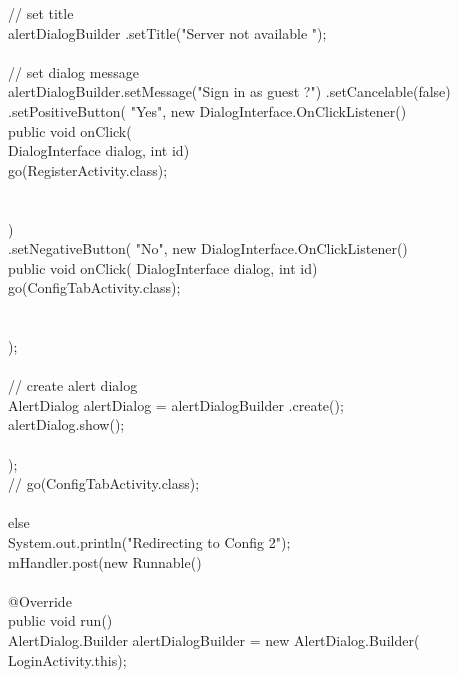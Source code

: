 \documentclass[12pt,a4paper]{article}
\begin{document}
{{{{{{{{									// set title\\
									alertDialogBuilder
											.setTitle("Server not available ");\\
\\
									// set dialog message\\
									alertDialogBuilder.setMessage("Sign in as guest ?")
											.setCancelable(false)
											.setPositiveButton(
													"Yes",
													new DialogInterface.OnClickListener() {\\
														public void onClick(\\
																DialogInterface dialog,
																int id) {\\
															go(RegisterActivity.class);\\
\\
														}\\
													})\\
											.setNegativeButton(
													"No",
													new DialogInterface.OnClickListener() {\\
														public void onClick(
																DialogInterface dialog,
																int id) {\\
															go(ConfigTabActivity.class);\\
\\
														}\\
													});\\
\\
									// create alert dialog\\
									AlertDialog alertDialog = alertDialogBuilder
											.create();\\

									alertDialog.show();\\
								}\\

							});\\
							// go(ConfigTabActivity.class);\\
						}\\
					} else {\\
						System.out.println("Redirecting to Config 2");\\
						mHandler.post(new Runnable() {\\
\\
							@Override\\
							public void run() {\\
								AlertDialog.Builder alertDialogBuilder = new AlertDialog.Builder(
										LoginActivity.this);\\
										\\

}}}}}}}
\end{document}
